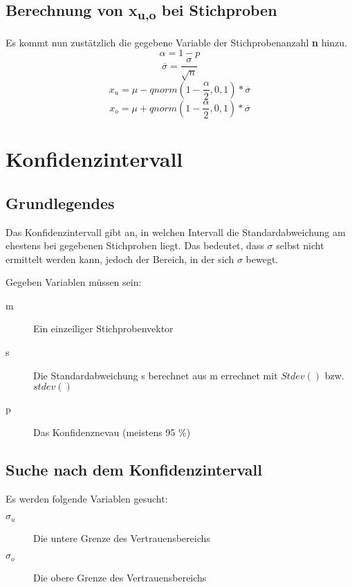 \documentclass[a4paper,10pt]{article}
\begin{document}
\subsection{Berechnung von x\textsubscript{u,o} bei Stichproben}
Es kommt nun zustätzlich die gegebene Variable der Stichprobenanzahl
\textbf{n} hinzu.
\begin{equation}
  \alpha = 1 - p
\end{equation}
\begin{equation}
  \overline{\sigma} = \frac{\sigma}{\sqrt{n}}
\end{equation}
\begin{equation}
  x_u = \mu - qnorm(1 - \frac{\alpha}{2}, 0, 1) * \overline{\sigma}
\end{equation}
\begin{equation}
  x_o = \mu + qnorm(1 - \frac{\alpha}{2}, 0, 1) * \overline{\sigma}
\end{equation}


\section{Konfidenzintervall}
\label{sec:konfidenzintervall}
\subsection{Grundlegendes}
Das Konfidenzintervall gibt an, in welchen Intervall die Standardabweichung am
ehestens bei gegebenen Stichproben liegt. Das bedeutet, dass $ \sigma $ selbst
nicht ermittelt werden kann, jedoch der Bereich, in der sich $ \sigma $ bewegt.

Gegeben Variablen müssen sein:
\begin{description}
\item[m] Ein einzeiliger Stichprobenvektor
\item[s] Die Standardabweichung s berechnet aus m errechnet mit $
  Stdev() $ bzw. $ stdev() $
\item[p] Das Konfidenznevau (meistens 95 \%)
\end{description}

\subsection{Suche nach dem Konfidenzintervall}
Es werden folgende Variablen gesucht:
\begin{description}
\item[$ \sigma_u $] Die untere Grenze des Vertrauensbereichs
\item[$ \sigma_o $] Die obere Grenze des Vertrauensbereichs
\end{description}
\end{document}
